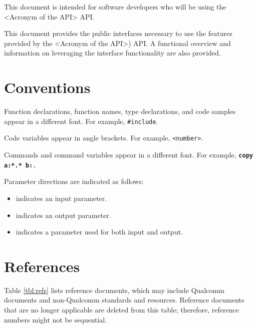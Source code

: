 This document is intended for software developers who will be using the <Acronym of the API> API.

This document provides the public interfaces necessary to use the features provided by the <Acronym of the API>) API. A functional overview and information on leveraging the interface functionality are also provided.


\section{Conventions}

Function declarations, function names, type declarations, and code samples appear in a different font. For example, \verb,#include,.

Code variables appear in angle brackets. For example, \verb,<number>,.

Commands and command variables appear in a different font. For example, \tt\textbf{copy a:*.* b:}\rm. 

Parameter directions are indicated as follows:

\begin{itemize} 
\item \space {\tt[in]} indicates an input parameter.   
\item \space {\tt[out]} indicates an output parameter.  
\item \space {\tt[in,out]} indicates a parameter used for both input and output. 
\end{itemize} 
\newpage 


\section{References}

Table \ref{tbl:refs} lists reference documents, which may include Qualcomm documents and non-Qualcomm standards and resources. Reference documents that are no longer applicable are deleted from this table; therefore, reference numbers might not be sequential.

